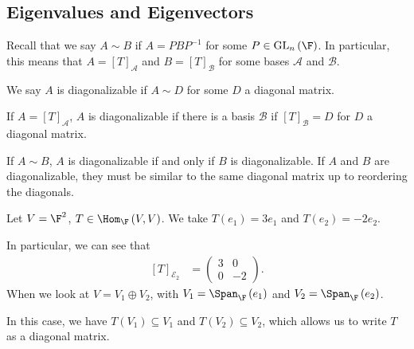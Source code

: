 \documentclass[10pt]{mypackage}
\begin{document}
\subsection{Eigenvalues and Eigenvectors}%
Recall that we say $A \sim B$ if $A = PBP^{-1}$ for some $P\in \text{GL}_{n}\left(\F\right)$. In particular, this means that $A = \left[T\right]_{\mathcal{A}}$ and $B = \left[T\right]_{\mathcal{B}}$ for some bases $\mathcal{A}$ and $\mathcal{B}$.
\begin{definition}[Diagonalizable]
  We say $A$ is diagonalizable if $A \sim D$ for some $D$ a diagonal matrix.\newline

  If $A = \left[T\right]_{\mathcal{A}}$, $A$ is diagonalizable if there is a basis $\mathcal{B}$ if $\left[T\right]_{\mathcal{B}} = D$ for $D$ a diagonal matrix.\newline

  If $A\sim B$, $A$ is diagonalizable if and only if $B$ is diagonalizable. If $A$ and $B$ are diagonalizable, they must be similar to the same diagonal matrix up to reordering the diagonals.
\end{definition}
\begin{example}
  Let $V = \F^2$, $T \in \Hom_{\F}\left(V,V\right)$. We take $T\left(e_1\right) = 3e_1$ and $T\left(e_2\right) = -2e_2$.\newline

  In particular, we can see that
  \begin{align*}
    \left[T\right]_{\mathcal{E}_2} &= \begin{pmatrix}3 & 0 \\ 0 & -2\end{pmatrix}.
  \end{align*}
  When we look at $V = V_1\oplus V_2$, with $V_1 = \Span_{\F}\left(e_1\right)$ and $V_2 = \Span_{\F}\left(e_2\right)$.\newline

  In this case, we have $T\left(V_1\right)\subseteq V_1$ and $T\left(V_2\right) \subseteq V_2$, which allows us to write $T$ as a diagonal matrix.
\end{example}
\end{document}
